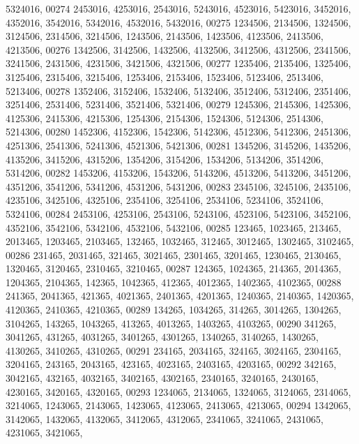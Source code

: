 \begin{DoxyCode}
      5324016,
00274       2453016, 4253016, 2543016, 5243016, 4523016, 5423016, 3452016, 4352016, 3542016, 5342016, 4532016, 
      5432016,
00275       1234506, 2134506, 1324506, 3124506, 2314506, 3214506, 1243506, 2143506, 1423506, 4123506, 2413506, 
      4213506,
00276       1342506, 3142506, 1432506, 4132506, 3412506, 4312506, 2341506, 3241506, 2431506, 4231506, 3421506, 
      4321506,
00277       1235406, 2135406, 1325406, 3125406, 2315406, 3215406, 1253406, 2153406, 1523406, 5123406, 2513406, 
      5213406,
00278       1352406, 3152406, 1532406, 5132406, 3512406, 5312406, 2351406, 3251406, 2531406, 5231406, 3521406, 
      5321406,
00279       1245306, 2145306, 1425306, 4125306, 2415306, 4215306, 1254306, 2154306, 1524306, 5124306, 2514306, 
      5214306,
00280       1452306, 4152306, 1542306, 5142306, 4512306, 5412306, 2451306, 4251306, 2541306, 5241306, 4521306, 
      5421306,
00281       1345206, 3145206, 1435206, 4135206, 3415206, 4315206, 1354206, 3154206, 1534206, 5134206, 3514206, 
      5314206,
00282       1453206, 4153206, 1543206, 5143206, 4513206, 5413206, 3451206, 4351206, 3541206, 5341206, 4531206, 
      5431206,
00283       2345106, 3245106, 2435106, 4235106, 3425106, 4325106, 2354106, 3254106, 2534106, 5234106, 3524106, 
      5324106,
00284       2453106, 4253106, 2543106, 5243106, 4523106, 5423106, 3452106, 4352106, 3542106, 5342106, 4532106, 
      5432106,
00285        123465, 1023465,  213465, 2013465, 1203465, 2103465,  132465, 1032465,  312465, 3012465, 1302465, 
      3102465,
00286        231465, 2031465,  321465, 3021465, 2301465, 3201465, 1230465, 2130465, 1320465, 3120465, 2310465, 
      3210465,
00287        124365, 1024365,  214365, 2014365, 1204365, 2104365,  142365, 1042365,  412365, 4012365, 1402365, 
      4102365,
00288        241365, 2041365,  421365, 4021365, 2401365, 4201365, 1240365, 2140365, 1420365, 4120365, 2410365, 
      4210365,
00289        134265, 1034265,  314265, 3014265, 1304265, 3104265,  143265, 1043265,  413265, 4013265, 1403265, 
      4103265,
00290        341265, 3041265,  431265, 4031265, 3401265, 4301265, 1340265, 3140265, 1430265, 4130265, 3410265, 
      4310265,
00291        234165, 2034165,  324165, 3024165, 2304165, 3204165,  243165, 2043165,  423165, 4023165, 2403165, 
      4203165,
00292        342165, 3042165,  432165, 4032165, 3402165, 4302165, 2340165, 3240165, 2430165, 4230165, 3420165, 
      4320165,
00293       1234065, 2134065, 1324065, 3124065, 2314065, 3214065, 1243065, 2143065, 1423065, 4123065, 2413065, 
      4213065,
00294       1342065, 3142065, 1432065, 4132065, 3412065, 4312065, 2341065, 3241065, 2431065, 4231065, 3421065, 

\end{DoxyCode}
